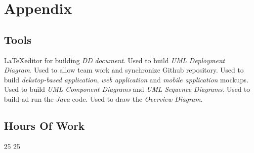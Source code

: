 \section{Appendix}
\subsection{Tools}
\begin{itemize}
	 \LaTeX editor for building \textit{DD document}.
	 Used to build \textit{UML Deployment Diagram}.
	 Used to allow team work and synchronize Github repository.
	 Used to build \textit{dekstop-based application}, \textit{web application} and \textit{mobile application} mockups.
	 Used to build \textit{UML Component Diagrams} and \textit{UML Sequence Diagrams}.
	 Used to build ad run the \textit{Java} code.
	 Used to draw the \textit{Overview Diagram}.
\end{itemize}
\subsection{Hours Of Work}
\begin{itemize}
	 25
	 25
\end{itemize}
